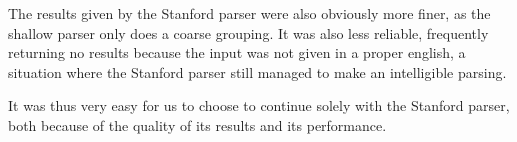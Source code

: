 The results given by the Stanford parser were also obviously more finer, as the shallow parser only does a coarse grouping. It was also less reliable, frequently returning no results because the input was not given in a proper english, a situation where the Stanford parser still managed to make an intelligible parsing.

It was thus very easy for us to choose to continue solely with the Stanford parser, both because of the quality of its results and its performance.




